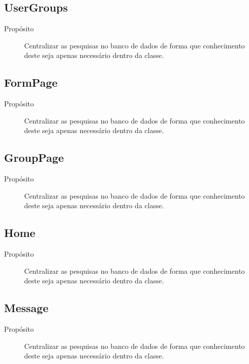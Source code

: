 \documentclass[a4paper]{article}
\begin{document}
	
	\subsection{UserGroups}
	
	\begin{description}
		\item [Propósito] Centralizar as pesquisas no banco de dados de forma que conhecimento deste seja apenas necessário dentro da classe.
	\end{description}
	
	\subsection{FormPage}
	
	\begin{description}
		\item [Propósito] Centralizar as pesquisas no banco de dados de forma que conhecimento deste seja apenas necessário dentro da classe.
	\end{description}
	
	\subsection{GroupPage}
	
	\begin{description}
		\item [Propósito] Centralizar as pesquisas no banco de dados de forma que conhecimento deste seja apenas necessário dentro da classe.
	\end{description}
	
	\subsection{Home}
	
	\begin{description}
		\item [Propósito] Centralizar as pesquisas no banco de dados de forma que conhecimento deste seja apenas necessário dentro da classe.
	\end{description}
	
	\subsection{Message}
	
	\begin{description}
		\item [Propósito] Centralizar as pesquisas no banco de dados de forma que conhecimento deste seja apenas necessário dentro da classe.
	\end{description}
 
\end{document}
